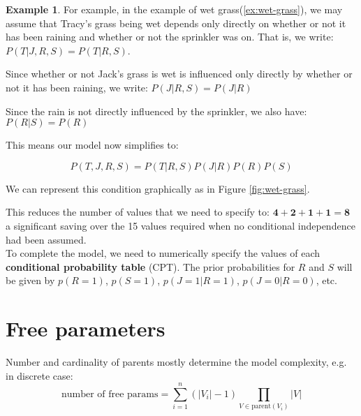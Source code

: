 \documentclass[12pt, a4paper]{article}
\theoremstyle{definition}
\newtheorem{example}{Example}[section]
\numberwithin{figure}{section}
\numberwithin{equation}{section}
\numberwithin{table}{section}
\begin{document}
\begin{example}
For example, in the example of wet grass(\ref{ex:wet-grass}), we may assume that Tracy's grass being wet depends only directly on whether or not it has been raining and whether or not the sprinkler was on.  
That is, we write: $P(T | J, R, S) = P(T | R, S)$.

Since whether or not Jack's grass is wet is influenced only directly by whether or not it has been raining, we write: $P(J | R, S) = P(J | R)$

Since the rain is not directly influenced by the sprinkler, we also have: $P(R | S) = P(R)$

This means our model now simplifies to:

$$P(T, J, R, S) = P(T | R, S) P(J | R) P(R) P(S)$$

We can represent this condition graphically as in Figure \ref{fig:wet-grass}.


This reduces the number of values that we need to specify to: $\boldsymbol{4 + 2 + 1 + 1 = 8}$ a significant saving over the 15 values required when no conditional independence had been assumed.\\

    To complete the model, we need to numerically specify the values of each \textbf{conditional probability table} (CPT). The prior probabilities for $R$ and $S$ will be given by $p(R=1)$, $p(S=1)$, $p(J=1|R=1)$, $p(J=0|R=0)$, etc.

\end{example}

\section{Free parameters}
Number and cardinality of parents mostly determine the model complexity, e.g. in discrete case:
\begin{equation}
\text{number of free params} = \sum_{i=1}^{n} (|V_i| - 1) \prod_{V \in \text{parent}(V_i)} |V|
\end{equation}
\end{document}

